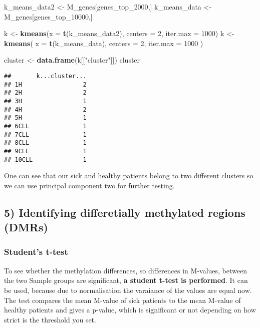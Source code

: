 \documentclass[]{article}
\newenvironment{Shaded}{\begin{snugshade}}{\end{snugshade}}
\newcommand{\KeywordTok}[1]{\textcolor[rgb]{0.13,0.29,0.53}{\textbf{#1}}}
\newcommand{\DataTypeTok}[1]{\textcolor[rgb]{0.13,0.29,0.53}{#1}}
\newcommand{\DecValTok}[1]{\textcolor[rgb]{0.00,0.00,0.81}{#1}}
\newcommand{\StringTok}[1]{\textcolor[rgb]{0.31,0.60,0.02}{#1}}
\newcommand{\NormalTok}[1]{#1}
\begin{document}
\begin{Shaded}
\begin{Highlighting}[]
\NormalTok{k_means_data2 <-}\StringTok{ }\NormalTok{M_genes[genes_top_}\DecValTok{2000}\NormalTok{,]}
\NormalTok{k_means_data <-}\StringTok{ }\NormalTok{M_genes[genes_top_}\DecValTok{10000}\NormalTok{,]}

\NormalTok{k <-}\StringTok{ }\KeywordTok{kmeans}\NormalTok{(}\DataTypeTok{x =} \KeywordTok{t}\NormalTok{(k_means_data2), }\DataTypeTok{centers =} \DecValTok{2}\NormalTok{, }\DataTypeTok{iter.max =} \DecValTok{1000}\NormalTok{)}
\NormalTok{k <-}
\StringTok{  }\KeywordTok{kmeans}\NormalTok{(}
    \DataTypeTok{x =} \KeywordTok{t}\NormalTok{(k_means_data),}
    \DataTypeTok{centers =} \DecValTok{2}\NormalTok{,}
    \DataTypeTok{iter.max =} \DecValTok{1000}
\NormalTok{  )}

\NormalTok{cluster <-}\StringTok{ }\KeywordTok{data.frame}\NormalTok{(k[[}\StringTok{"cluster"}\NormalTok{]])}
\NormalTok{cluster}
\end{Highlighting}
\end{Shaded}

\begin{verbatim}
##       k...cluster...
## 1H                 2
## 2H                 2
## 3H                 1
## 4H                 2
## 5H                 1
## 6CLL               1
## 7CLL               1
## 8CLL               1
## 9CLL               1
## 10CLL              1
\end{verbatim}

One can see that our sick and healthy patients belong to two different
clusters so we can use principal component two for further testing.

\subsection{5) Identifying differetially methylated regions
(DMRs)}\label{identifying-differetially-methylated-regions-dmrs}

\subsubsection{Student's t-test}\label{students-t-test}

To see whether the methylation differences, so differences in M-values,
between the two Sample groups are significant, \textbf{a student t-test
is performed}. It can be used, because due to normalisation the
varaiance of the values are equal now. The test compares the mean
M-value of sick patients to the mean M-value of healthy patients and
gives a p-value, which is significant or not depending on how strict is
the threshold you set.
\end{document}
